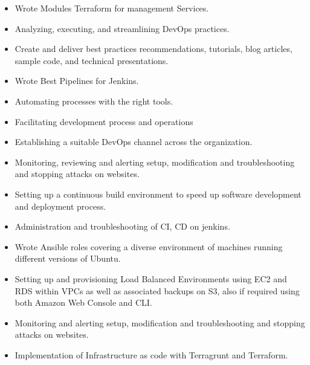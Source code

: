 \divider

\begin{itemize}
    \item Wrote Modules Terraform for management Services.
    \item Analyzing, executing, and streamlining DevOps practices.
    \item Create and deliver best practices recommendations, tutorials, blog articles, sample code, and technical presentations.
    \item Wrote Best Pipelines for Jenkins.
    \item Automating processes with the right tools.
    \item Facilitating development process and operations
    \item Establishing a suitable DevOps channel across the organization.
    \item Monitoring, reviewing and alerting setup, modification and troubleshooting and stopping attacks on websites.
    \item Setting up a continuous build environment to speed up software development and deployment process.
    \item Administration and troubleshooting of CI, CD on jenkins.
\end{itemize}

\divider

\begin{itemize}
    \item Wrote Ansible roles covering a diverse environment of machines running different versions of Ubuntu.
    \item Setting up and provisioning Load Balanced Environments using EC2 and RDS within VPCs as well as associated backups on S3, also if required using both Amazon Web Console and CLI.
    \item Monitoring and alerting setup, modification and troubleshooting and stopping attacks on websites.
    \item Implementation of Infrastructure as code with Terragrunt and Terraform.
\end{itemize}

\divider

